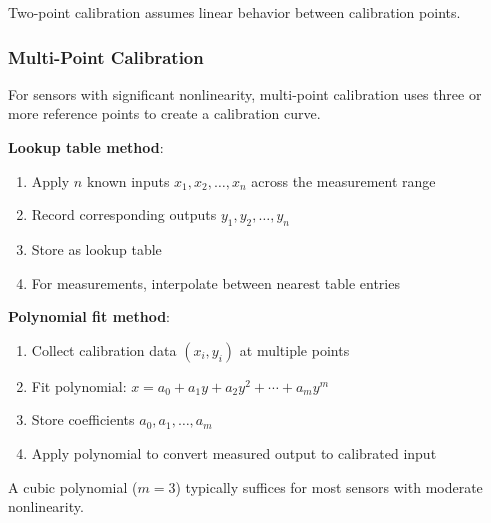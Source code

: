 Two-point calibration assumes linear behavior between calibration points.

\subsubsection{Multi-Point Calibration}

For sensors with significant nonlinearity, multi-point calibration uses three or more reference points to create a calibration curve.

\textbf{Lookup table method}:
\begin{enumerate}
    \item Apply $n$ known inputs $x_1, x_2, \ldots, x_n$ across the measurement range
    \item Record corresponding outputs $y_1, y_2, \ldots, y_n$
    \item Store as lookup table
    \item For measurements, interpolate between nearest table entries
\end{enumerate}

\textbf{Polynomial fit method}:
\begin{enumerate}
    \item Collect calibration data $(x_i, y_i)$ at multiple points
    \item Fit polynomial: $x = a_0 + a_1 y + a_2 y^2 + \cdots + a_m y^m$
    \item Store coefficients $a_0, a_1, \ldots, a_m$
    \item Apply polynomial to convert measured output to calibrated input
\end{enumerate}

A cubic polynomial ($m = 3$) typically suffices for most sensors with moderate nonlinearity.

